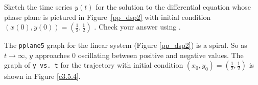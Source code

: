 \documentclass{ximera}
\begin{document}
\begin{computerExercise} \label{c3.5.4}
Sketch the time series $y(t)$ for the solution to the
differential equation whose phase plane is pictured in
Figure~\ref{pp_dsp2} with initial condition
$(x(0),y(0))=\left(\frac{1}{2},\frac{1}{2}\right)$ .  Check your answer
using {\pplane}.

\begin{solution}

The {\tt pplane5} graph for the linear system (Figure \ref{pp_dsp2}) is
a spiral.  So as $t \rightarrow \infty$, $y$ approaches $0$ oscillating
between positive and negative values.  The graph of {\tt y vs.\ t} for the
trajectory with initial condition $(x_0,y_0) = \left(\frac{1}{2},
\frac{1}{2}\right)$ is shown in Figure \ref{c3.5.4}.

\begin{figure}[htb]
                       \centerline{%
                       }
\end{figure}

\end{solution}
\end{computerExercise}
\end{document}

